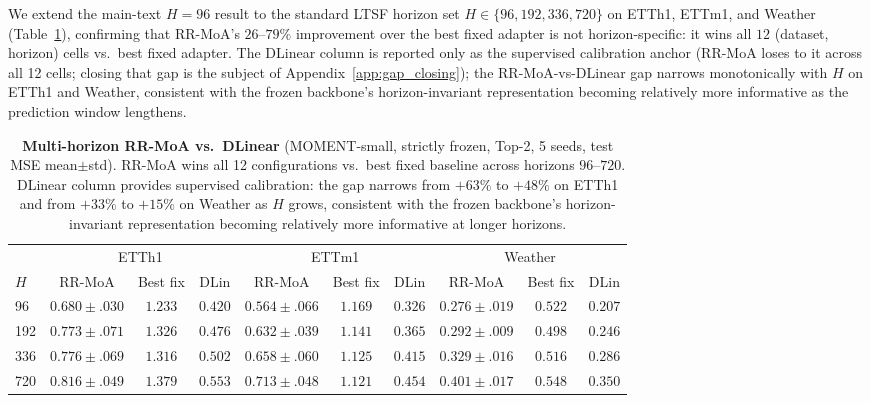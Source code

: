 \documentclass{article}
\begin{document}
We extend the main-text $H{=}96$ result to the standard LTSF horizon set $H{\in}\{96,192,336,720\}$ on ETTh1, ETTm1, and Weather (Table~\ref{tab:horizon}), confirming that RR-MoA's $26$--$79\%$ improvement over the best fixed adapter is not horizon-specific: it wins all $12$ (dataset, horizon) cells vs.\ best fixed adapter. The DLinear column is reported only as the supervised calibration anchor (RR-MoA loses to it across all 12 cells; closing that gap is the subject of Appendix~\ref{app:gap_closing}); the RR-MoA-vs-DLinear gap narrows monotonically with $H$ on ETTh1 and Weather, consistent with the frozen backbone's horizon-invariant representation becoming relatively more informative as the prediction window lengthens.

\begin{table}[!htbp]
\centering
\caption{\textbf{Multi-horizon RR-MoA vs.\ DLinear} (MOMENT-small, strictly frozen, Top-2, 5 seeds, test MSE mean$\pm$std). RR-MoA wins all 12 configurations vs.\ best fixed baseline across horizons $96$--$720$. DLinear column provides supervised calibration: the gap narrows from $+63\%$ to $+48\%$ on ETTh1 and from $+33\%$ to $+15\%$ on Weather as $H$ grows, consistent with the frozen backbone's horizon-invariant representation becoming relatively more informative at longer horizons.}
\label{tab:horizon}
\scriptsize
\begin{tabular}{@{}lccccccccc@{}}
\toprule
 & \multicolumn{3}{c}{ETTh1} & \multicolumn{3}{c}{ETTm1} & \multicolumn{3}{c}{Weather} \\
\cmidrule(lr){2-4} \cmidrule(lr){5-7} \cmidrule(lr){8-10}
$H$ & RR-MoA & Best fix & DLin & RR-MoA & Best fix & DLin & RR-MoA & Best fix & DLin \\
\midrule
96  & $0.680{\pm}.030$ & $1.233$ & $\mathit{0.420}$ & $0.564{\pm}.066$ & $1.169$ & $\mathit{0.326}$ & $0.276{\pm}.019$ & $0.522$ & $\mathit{0.207}$ \\
192 & $0.773{\pm}.071$ & $1.326$ & $\mathit{0.476}$ & $0.632{\pm}.039$ & $1.141$ & $\mathit{0.365}$ & $0.292{\pm}.009$ & $0.498$ & $\mathit{0.246}$ \\
336 & $0.776{\pm}.069$ & $1.316$ & $\mathit{0.502}$ & $0.658{\pm}.060$ & $1.125$ & $\mathit{0.415}$ & $0.329{\pm}.016$ & $0.516$ & $\mathit{0.286}$ \\
720 & $0.816{\pm}.049$ & $1.379$ & $\mathit{0.553}$ & $0.713{\pm}.048$ & $1.121$ & $\mathit{0.454}$ & $0.401{\pm}.017$ & $0.548$ & $\mathit{0.350}$ \\
\bottomrule
\end{tabular}
\end{table}
\end{document}
